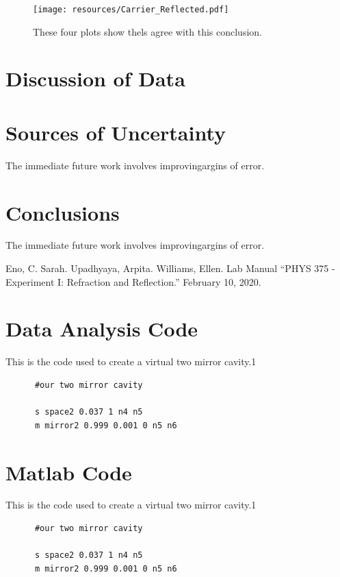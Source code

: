 \documentclass[colorlinks=true,pdfstartview=FitV,linkcolor=blue,
            citecolor=red,urlcolor=magenta]{basedoc}
\begin{document}
    \begin{figure}[!h]
      \begin{center}
      \texttt{[image: resources/Carrier\_Reflected.pdf]}
      \caption{These four plots show thels agree with this conclusion. }
      \label{fig:Carrier_Reflected}
      \end{center}
    \end{figure} \clearpage


  \section{Discussion of Data}


\section{Sources of Uncertainty}
  The immediate future work involves improvingargins of error.



\section{Conclusions}
  The immediate future work involves improvingargins of error.



\begin{thebibliography}{9}

    Eno, C. Sarah. Upadhyaya, Arpita. Williams, Ellen. Lab Manual ``PHYS 375 - Experiment I: Refraction and Reflection.'' February 10, 2020.


\end{thebibliography} %


\appendix \clearpage

\section{Data Analysis Code} \label{appendix:a}

  This is the code used to create a virtual two mirror cavity.1
    \begin{verbatim}
      #our two mirror cavity

      s space2 0.037 1 n4 n5
      m mirror2 0.999 0.001 0 n5 n6
    \end{verbatim}



\section{Matlab Code} \label{appendix:B}

  This is the code used to create a virtual two mirror cavity.1
    \begin{verbatim}
      #our two mirror cavity

      s space2 0.037 1 n4 n5
      m mirror2 0.999 0.001 0 n5 n6
    \end{verbatim}
\end{document}

